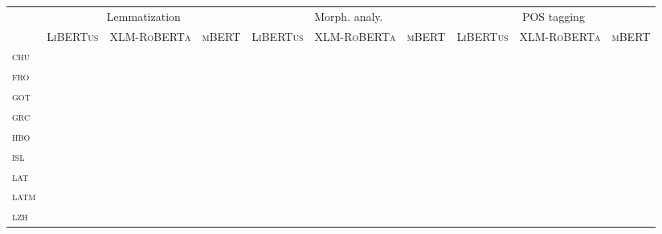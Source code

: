 \documentclass{../acl_latex.tex}
\begin{document}
\begin{table*}[t]
\centering
\begin{tabular}{lrrrrrrrrr}
\toprule
                 & \multicolumn{3}{c}{Lemmatization} & \multicolumn{3}{c}{Morph. analy.} & \multicolumn{3}{c}{POS tagging} \\
                 & \textsc{LiBERTus} & \textsc{XLM-RoBERTa} &  \textsc{mBERT}  & \textsc{LiBERTus} & \textsc{XLM-RoBERTa} &  \textsc{mBERT} & \textsc{LiBERTus} & \textsc{XLM-RoBERTa} &  \textsc{mBERT}\\ \midrule
\textsc{chu}     &                   &                      &                  &                   &                      &                 &                   &                      &                \\ 
\textsc{fro}     &                   &                      &                  &                   &                      &                 &                   &                      &                \\
\textsc{got}     &                   &                      &                  &                   &                      &                 &                   &                      &                \\
\textsc{grc}     &                   &                      &                  &                   &                      &                 &                   &                      &                \\
\textsc{hbo}     &                   &                      &                  &                   &                      &                 &                   &                      &                \\
\textsc{isl}     &                   &                      &                  &                   &                      &                 &                   &                      &                \\
\textsc{lat}     &                   &                      &                  &                   &                      &                 &                   &                      &                \\
\textsc{latm}    &                   &                      &                  &                   &                      &                 &                   &                      &                \\
\textsc{lzh}     &                   &                      &                  &                   &                      &                 &                   &                      &                \\

\end{tabular}
\end{table*}
\end{document}
